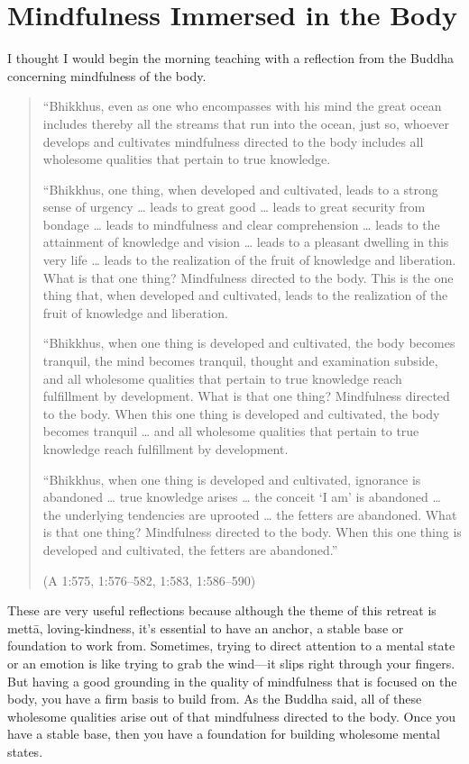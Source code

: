 \chapter{Mindfulness Immersed in the
Body}

I thought I would begin the morning teaching with a reflection from the
Buddha concerning mindfulness of the body.

\begin{quotation}
“Bhikkhus, even as one who encompasses with his mind the great ocean
includes thereby all the streams that run into the ocean, just so,
whoever develops and cultivates mindfulness directed to the body
includes all wholesome qualities that pertain to true knowledge.

“Bhikkhus, one thing, when developed and cultivated, leads to a strong
sense of urgency \ldots{} leads to great good \ldots{} leads to great security
from bondage \ldots{} leads to mindfulness and clear comprehension \ldots{} leads
to the attainment of knowledge and vision \ldots{} leads to a pleasant
dwelling in this very life \ldots{} leads to the realization of the fruit of
knowledge and liberation. What is that one thing? Mindfulness directed
to the body. This is the one thing that, when developed and cultivated,
leads to the realization of the fruit of knowledge and liberation.

“Bhikkhus, when one thing is developed and cultivated, the body becomes
tranquil, the mind becomes tranquil, thought and examination subside,
and all wholesome qualities that pertain to true knowledge reach
fulfillment by development. What is that one thing? Mindfulness directed
to the body. When this one thing is developed and cultivated, the body
becomes tranquil \ldots{} and all wholesome qualities that pertain to true
knowledge reach fulfillment by development.

“Bhikkhus, when one thing is developed and cultivated, ignorance is
abandoned \ldots{} true knowledge arises \ldots{} the conceit ‘I am’ is abandoned
\ldots{} the underlying tendencies are uprooted \ldots{} the fetters are
abandoned. What is that one thing? Mindfulness directed to the body.
When this one thing is developed and cultivated, the fetters are
abandoned.”

\hspace*{\fill}(A 1:575, 1:576–582, 1:583, 1:586–590)
\end{quotation}

These are very useful reflections because although the theme of this
retreat is mettā, loving-kindness, it’s essential to have an anchor, a
stable base or foundation to work from. Sometimes, trying to direct
attention to a mental state or an emotion is like trying to grab the
wind—it slips right through your fingers. But having a good grounding in
the quality of mindfulness that is focused on the body, you have a firm
basis to build from. As the Buddha said, all of these wholesome
qualities arise out of that mindfulness directed to the body. Once you
have a stable base, then you have a foundation for building wholesome
mental states.

